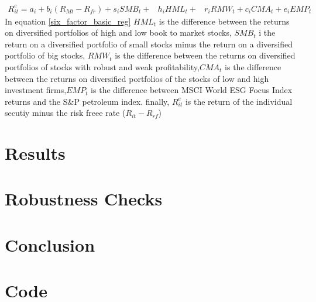 \documentclass[12pt,oneside,reqno]{amsart}
\begin{document}
\begin{equation}
\begin{split}
    R_{it}^e = a_i+b_i(R_{Mt}-R_{fr})+s_iSMB_t+ & h_iHML_t+ & r_iRMW_t+c_iCMA_t+e_iEMP_t
    \end{split}
    \label{six_factor_basic_reg}
\end{equation}
In equation \eqref{six_factor_basic_reg} $HML_{t}$ is the difference between the returns on diversified portfolios of high and low book to market stocks, $SMB_{t}$ i the return on a diversified portfolio of small stocks minus the return on a diversified portfolio of big stocks, $RMW_t$ is the difference between the returns on diversified portfolios of stocks with robust and weak profitability,$CMA_{t}$ is the difference between the returns on diversified portfolios of the stocks of low and high investment firms,$EMP_t$ is the difference between MSCI World ESG Focus Index returns and the S\&P petroleum index. finally, $R^e_{it}$ is the return of the individual secutiy minus the risk freee rate ($R_{it}-R_{rf}$)


\section{Results}
\label{Results}

\section{Robustness Checks}
\label{Robustness}

\section{Conclusion}
\label{Conclusion}

{}


\section{Code}

\end{document}
